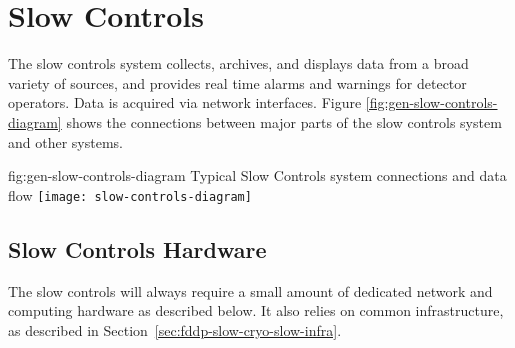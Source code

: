 \section{Slow Controls}
\label{sec:fddp-slow-cryo-ctrl}


The slow controls system collects, archives, and displays data from
a broad variety of sources, and provides real time alarms and
warnings for detector operators. Data is acquired via network
interfaces.  Figure \ref{fig:gen-slow-controls-diagram} shows the
connections between major parts of the slow controls system and other
systems.  %

\begin{dunefigure}{fig:gen-slow-controls-diagram}
{Typical Slow Controls system connections and data flow}
\texttt{[image: slow-controls-diagram]}
\end{dunefigure}





\subsection{Slow Controls Hardware}
\label{sec:fddp-slow-cryo-hdwr}

The slow controls will always require a small amount of dedicated network and
computing hardware as described below.  It also relies on common
infrastructure, as described in
Section~\ref{sec:fddp-slow-cryo-slow-infra}.


